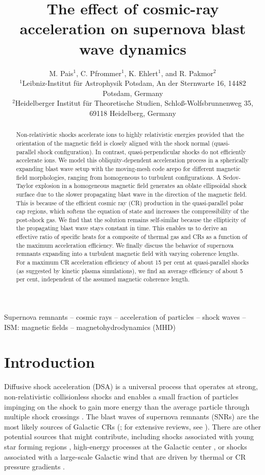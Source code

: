 \documentclass[8pt,a4paper,usenatbib]{mnras}
\author[Pais, Pfrommer, Ehlert \& Pakmor]{M. Pais$^{1}$, C. Pfrommer$^{1}$, K. Ehlert$^{1}$, and R. Pakmor$^{2}$
\\
$^{1}$Leibniz-Institut f\"{u}r Astrophysik Potsdam,  An der Sternwarte 16, 14482 Potsdam, Germany \\
$^{2}$Heidelberger Institut für Theoretische Studien, Schlo\ss -Wolfsbrunnenweg 35, 69118 Heidelberg, Germany  \\
}
\title{The effect of cosmic-ray acceleration on supernova blast wave dynamics}
\date{}
\begin{document}
\maketitle
\begin{abstract}
  Non-relativistic shocks accelerate ions to highly relativistic energies
  provided that the orientation of the magnetic field is closely aligned with
  the shock normal (quasi-parallel shock configuration). In contrast,
  quasi-perpendicular shocks do not efficiently accelerate ions. We model this
  obliquity-dependent acceleration process in a spherically expanding blast wave
  setup with the moving-mesh code {\sc arepo} for different magnetic field
  morphologies, ranging from homogeneous to turbulent configurations. A
  Sedov-Taylor explosion in a homogeneous magnetic field generates an oblate
  ellipsoidal shock surface due to the slower propagating blast wave in the
  direction of the magnetic field. This is because of the efficient cosmic ray
  (CR) production in the quasi-parallel polar cap regions, which softens the
  equation of state and increases the compressibility of the post-shock gas. We
  find that the solution remains self-similar because the ellipticity of the
  propagating blast wave stays constant in time. This enables us to derive an
  effective ratio of specific heats for a composite of thermal gas and CRs as a
  function of the maximum acceleration efficiency. We finally discuss the
  behavior of supernova remnants expanding into a turbulent magnetic field with
  varying coherence lengths. For a maximum CR acceleration efficiency of about
  15 per cent at quasi-parallel shocks (as suggested by kinetic plasma
  simulations), we find an average efficiency of about 5 per cent, independent
  of the assumed magnetic coherence length.
\end{abstract}


\begin{keywords}
Supernova remnants -- cosmic rays -- acceleration of particles -- shock waves --
ISM: magnetic fields -- magnetohydrodynamics (MHD)
\end{keywords}



\section{Introduction}
Diffusive shock acceleration (DSA) is a universal process that operates at
strong, non-relativistic collisionless shocks and enables a small fraction of
particles impinging on the shock to gain more energy than the average particle
through multiple shock crossings \citep{1977ICRC...11..132A,1977DoSSR.234.1306K,
  1978MNRAS.182..147B,1978ApJ...221L..29B}.  The blast waves of supernova
remnants (SNRs) are the most likely sources of Galactic CRs
(\citealt{Neronov2017}; for extensive reviews, see \citealt{2008ARA&A..46...89R,
  2016RPPh...79d6901M}). There are other potential sources that might
contribute, including shocks associated with young star forming regions
\citep{2017arXiv171002803Y}, high-energy processes at the Galactic center
\citep{2016Natur.531..476H}, or shocks associated with a large-scale Galactic
wind that are driven by thermal or CR pressure gradients
\citep{2015MNRAS.453.3827S,2017ApJ...847L..13P}.
\end{document}
